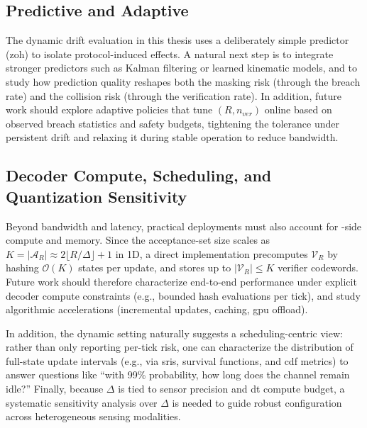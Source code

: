 \subsection[Predictive DTs and Adaptive K-ID]{Predictive  and Adaptive }
The dynamic drift evaluation in this thesis uses a deliberately simple predictor (\gls{zoh}) to isolate protocol-induced effects. A natural next step is to integrate stronger predictors such as Kalman filtering or learned kinematic models, and to study how prediction quality reshapes both the masking risk (through the breach rate) and the collision risk (through the verification rate). In addition, future work should explore adaptive policies that tune $(R,n_{ver})$ online based on observed breach statistics and safety budgets, tightening the tolerance under persistent drift and relaxing it during stable operation to reduce bandwidth.

\subsection{Decoder Compute, Scheduling, and Quantization Sensitivity}
Beyond bandwidth and latency, practical deployments must also account for -side compute and memory. Since the acceptance-set size scales as $K=|\mathcal{A}_R|\approx 2\lfloor R/\Delta\rfloor+1$ in 1D, a direct implementation precomputes $\mathcal{V}_R$ by hashing $\mathcal{O}(K)$ states per  update, and stores up to $|\mathcal{V}_R|\le K$ verifier codewords. Future work should therefore characterize end-to-end performance under explicit decoder compute constraints (e.g., bounded hash evaluations per tick), and study algorithmic accelerations (incremental updates, caching, \gls{gpu} offload).

In addition, the dynamic setting naturally suggests a scheduling-centric view: rather than only reporting per-tick risk, one can characterize the distribution of full-state update intervals (e.g., via \glspl{sri}, survival functions, and \gls{cdf} metrics) to answer questions like ``with 99\% probability, how long does the channel remain idle?'' Finally, because $\Delta$ is tied to sensor precision and \gls{dt} compute budget, a systematic sensitivity analysis over $\Delta$ is needed to guide robust configuration across heterogeneous sensing modalities.